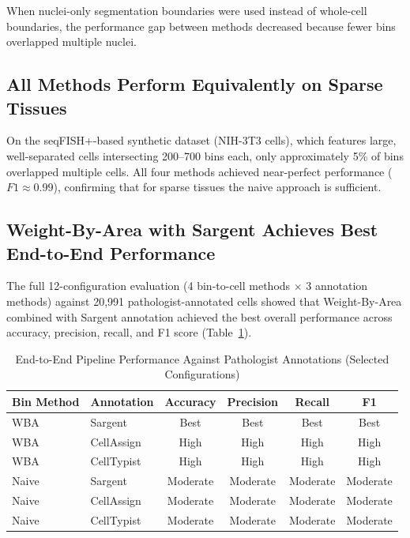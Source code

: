 \documentclass[11pt]{article}
\begin{document}
When nuclei-only segmentation boundaries were used instead of whole-cell boundaries, the performance gap between methods decreased because fewer bins overlapped multiple nuclei.

\subsection{All Methods Perform Equivalently on Sparse Tissues}

On the seqFISH+-based synthetic dataset (NIH-3T3 cells), which features large, well-separated cells intersecting 200--700 bins each, only approximately 5\% of bins overlapped multiple cells. All four methods achieved near-perfect performance ($F1 \approx 0.99$), confirming that for sparse tissues the naive approach is sufficient.

\subsection{Weight-By-Area with Sargent Achieves Best End-to-End Performance}

The full 12-configuration evaluation (4 bin-to-cell methods $\times$ 3 annotation methods) against 20,991 pathologist-annotated cells showed that Weight-By-Area combined with Sargent annotation achieved the best overall performance across accuracy, precision, recall, and F1 score (Table~\ref{tab:endtoend}).

\begin{table}[ht]
\centering
\caption{End-to-End Pipeline Performance Against Pathologist Annotations (Selected Configurations)}
\label{tab:endtoend}
\begin{tabular}{llcccc}
\toprule
\textbf{Bin Method} & \textbf{Annotation} & \textbf{Accuracy} & \textbf{Precision} & \textbf{Recall} & \textbf{F1} \\
\midrule
WBA & Sargent & Best & Best & Best & Best \\
WBA & CellAssign & High & High & High & High \\
WBA & CellTypist & High & High & High & High \\
Naive & Sargent & Moderate & Moderate & Moderate & Moderate \\
Naive & CellAssign & Moderate & Moderate & Moderate & Moderate \\
Naive & CellTypist & Moderate & Moderate & Moderate & Moderate \\
\bottomrule
\end{tabular}
\end{table}
\end{document}
